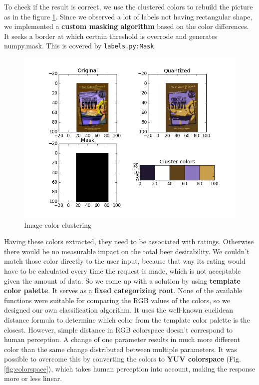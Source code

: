 \documentclass[10pt]{IEEEtran}
\begin{document}
To check if the result is correct, we use the clustered colors to rebuild the picture as in the figure \ref{fig:colorClustering}. Since we observed a lot of labels not having rectangular shape, we implemented a \textbf{custom masking algorithm} based on the color differences. It seeks a border at which certain threshold is overrode and generates numpy.mask. This is covered by \texttt{labels.py:Mask}. 

\begin{figure}[b]
  \centering
  \includegraphics[width=\columnwidth]{./graphics/1.png}
  \caption{Image color clustering}
  \label{fig:colorClustering}
\end{figure}

Having these colors extracted, they need to be associated with ratings. Otherwise there would be no measurable impact on the total beer desirability. We couldn't match those color directly to the user input, because that way its rating would have to be calculated  every time the request is made, which is not acceptable given the amount of data. So we come up with a solution by using \textbf{template color palette}. It serves as a \textbf{fixed categorizing root}. None of the available functions were suitable for comparing the RGB values of the colors, so we designed our own classification algorithm. It uses the well-known euclidean distance formula to determine which color from the template color palette is the closest. However, simple distance in RGB colorspace doesn't correspond to human perception. A change of one parameter results in much more different color than the same change distributed between multiple parameters. It was possible to overcome this by converting the colors to \textbf{YUV colorspace} (Fig. \ref{fig:colorspace}), which takes human perception into account, making the response more or less linear. 
\end{document}
